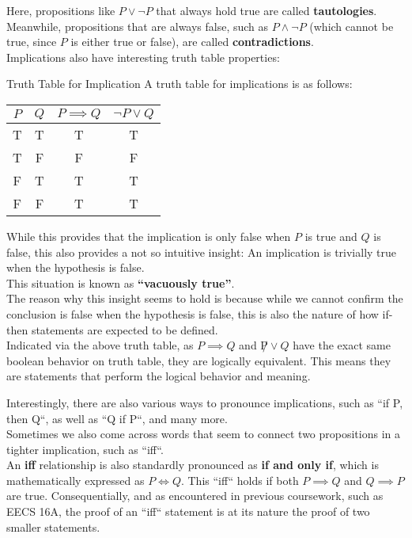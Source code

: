 Here, propositions like $P \lor \neg P$ that always hold true are called \textbf{tautologies}. \\
Meanwhile, propositions that are always false, such as $P \land \neg P$ (which cannot be true, since $P$ is either true or false), are called \textbf{contradictions}. \\
Implications also have interesting truth table properties:
\begin{ln-fig}{Truth Table for Implication}{}
    A truth table for implications is as follows:
    \begin{center}
        \begin{tabular}{c c||c c}
            $P$ & $Q$ & $P \implies Q$ & $\neg P \lor Q$ \\
            \hline
            T & T & T & T \\
            \hline
            T & F & F & F\\
            \hline
            F & T & T & T\\
            \hline
            F & F & T & T
        \end{tabular}
    \end{center}
    While this provides that the implication is only false when $P$ is true and $Q$ is false, this also provides a not so intuitive insight: An implication is trivially true when the hypothesis is false. \\
    This situation is known as \textbf{``vacuously true''}. \\
    The reason why this insight seems to hold is because while we cannot confirm the conclusion is false when the hypothesis is false, this is also the nature of how if-then statements are expected to be defined. \\

    Indicated via the above truth table, as $P \implies Q$ and $\not P \lor Q$ have the exact same boolean behavior on truth table, they are logically equivalent. This means they are statements that perform the logical behavior and meaning.
\end{ln-fig}
Interestingly, there are also various ways to pronounce implications, such as ``if P, then Q``, as well as ``Q if P``, and many more. \\
Sometimes we also come across words that seem to connect two propositions in a tighter implication, such as ``iff``. \\
An \textbf{iff} relationship is also standardly pronounced as \textbf{if and only if}, which is mathematically expressed as $P \iff Q$. This ``iff`` holds if both $P \implies Q$ and $Q \implies P$ are true. Consequentially, and as encountered in previous coursework, such as EECS 16A, the proof of an ``iff`` statement is at its nature the proof of two smaller statements.


